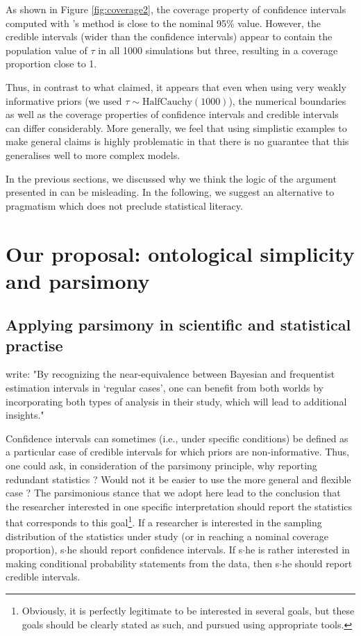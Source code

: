 \documentclass[a4paper,man,natbib,floatsintext,donotrepeattitle]{apa6}
\begin{document}
As shown in Figure \ref{fig:coverage2}, the coverage property of confidence intervals computed with \cite{viechtbauer_confidence_2007}'s method is close to the nominal 95\% value. However, the credible intervals (wider than the confidence intervals) appear to contain the population value of $\tau$ in all 1000 simulations but three, resulting in a coverage proportion close to 1.

Thus, in contrast to what \cite{albers_credible_2018} claimed, it appears that even when using very weakly informative priors (we used $\tau \sim \mathrm{HalfCauchy}(1000)$), the numerical boundaries as well as the coverage properties of confidence intervals and credible intervals can differ considerably. More generally, we feel that using simplistic examples to make general claims is highly problematic in that there is no guarantee that this generalises well to more complex models.

In the previous sections, we discussed why we think the logic of the argument presented in \cite{albers_credible_2018} can be misleading. In the following, we suggest an alternative to pragmatism which does not preclude statistical literacy.

\section{Our proposal: ontological simplicity and parsimony}

\subsection{Applying parsimony in scientific and statistical practise}

\cite{albers_credible_2018} write: "By recognizing the near-equivalence between Bayesian and frequentist estimation intervals in ‘regular cases’, one can benefit from both worlds by incorporating both types of analysis in their study, which will lead to additional insights."

Confidence intervals can sometimes (i.e., under specific conditions) be defined as a particular case of credible intervals for which priors are non-informative. Thus, one could ask, in consideration of the parsimony principle, why reporting redundant statistics ? Would not it be easier to use the more general and flexible case ? The parsimonious stance that we adopt here lead to the conclusion that the researcher interested in one specific interpretation should report the statistics that corresponds to this goal\footnote{Obviously, it is perfectly legitimate to be interested in several goals, but these goals should be clearly stated as such, and pursued using appropriate tools.}. If a researcher is interested in the sampling distribution of the statistics under study (or in reaching a nominal coverage proportion), s$\cdot$he should report confidence intervals. If s$\cdot$he is rather interested in making conditional probability statements from the data, then s$\cdot$he should report credible intervals.
\end{document}
